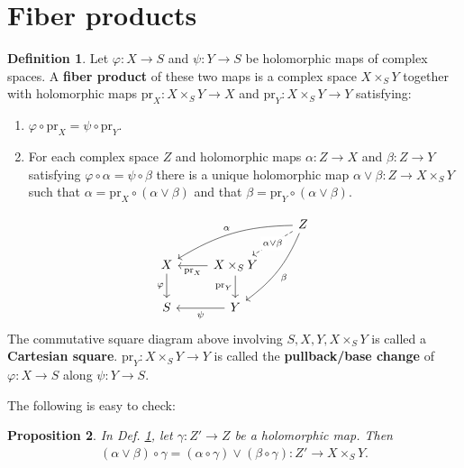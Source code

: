 \documentclass[12pt,b5paper,notitlepage]{report}
\theoremstyle{definition}
\newtheorem{df}{Definition}[section]
\theoremstyle{plain}
\newtheorem{pp}[df]{Proposition}
\newcommand{\pr}{\mathrm {pr}}
\numberwithin{equation}{section}
\begin{document}
\section{Fiber products}


\begin{df}\label{lb36}
Let $\varphi:X\rightarrow S$ and $\psi:Y\rightarrow S$ be holomorphic maps of complex spaces. A \textbf{fiber product} of these two maps  is a complex space $X\times_SY$ together with holomorphic maps $\pr_X:X\times_SY\rightarrow X$ and $\pr_Y:X\times_SY\rightarrow Y$ satisfying:
\begin{enumerate}[label=(\arabic*)]
\item $\varphi\circ\pr_X=\psi\circ\pr_Y$.
\item For each complex space $Z$ and holomorphic maps $\alpha:Z\rightarrow X$ and $\beta:Z\rightarrow Y$ satisfying $\varphi\circ\alpha=\psi\circ\beta$ there is a unique holomorphic map $\alpha\vee\beta:Z\rightarrow X\times_SY$  such that $\alpha=\pr_X\circ(\alpha\vee\beta)$ and that $\beta=\pr_Y\circ(\alpha\vee\beta)$.
\end{enumerate}
\begin{equation}
\begin{tikzcd}
                  &                                    & Z \arrow[ld, "\alpha\vee\beta" description, dashed] \arrow[lld, "\alpha"',bend right=15] \arrow[ldd, "\beta", bend left=15] \\
X \arrow[d, "\varphi"'] & X\times_SY \arrow[l, "\pr_X"] \arrow[d, "\pr_Y"'] &                                                               \\
S                 & Y \arrow[l, "\psi"]                  &                                                              
\end{tikzcd}
\end{equation}
The commutative square diagram above involving $S,X,Y,X\times_SY$ is called a \textbf{Cartesian square}.   $\pr_Y:X\times_SY\rightarrow Y$ is called the \textbf{pullback/base change} of $\varphi:X\rightarrow S$ along $\psi:Y\rightarrow S$.  \hfill\qedsymbol 
\end{df}

The following is easy to check:

\begin{pp}\label{lb37}
In Def. \ref{lb36}, let $\gamma:Z'\rightarrow Z$ be a holomorphic map. Then
\begin{align}
(\alpha\vee\beta)\circ\gamma=(\alpha\circ\gamma)\vee(\beta\circ\gamma):Z'\rightarrow X\times_SY.
\end{align}
\end{pp}
\end{document}
